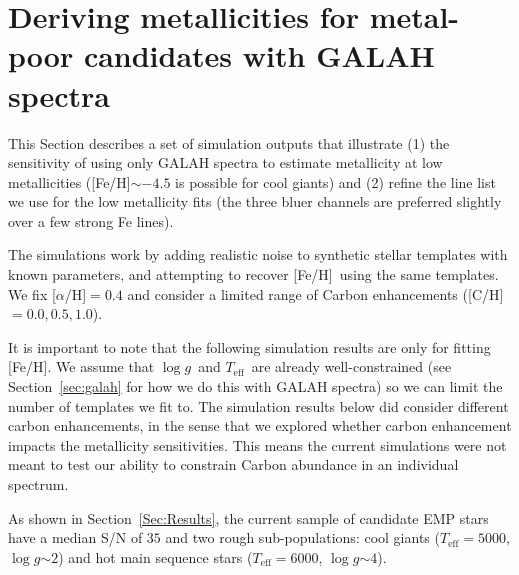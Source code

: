 \documentclass[]{aastex631}
\newcommand{\emps}{EMP stars\xspace}
\newcommand{\logg}{\ensuremath{\log g}\xspace}
\newcommand{\teff}{\ensuremath{T_{\mathrm{eff}}}\xspace}
\newcommand{\feh}{[Fe/H]\xspace}
\begin{document}




\appendix
\section{Deriving metallicities for metal-poor candidates with GALAH spectra}\label{deriving lines}

This Section describes a set of simulation outputs that illustrate (1) the sensitivity of using only GALAH spectra to estimate metallicity at low metallicities (\feh $\sim-4.5$ is possible for cool giants) and (2) refine the line list we use for the low metallicity fits (the three bluer channels are preferred slightly over a few strong Fe lines).

The simulations work by adding realistic noise to synthetic stellar templates with known parameters, and attempting to recover \feh \ using the same templates.  We fix [$\alpha$/H]$=0.4$ and consider a limited range of Carbon enhancements ([C/H]$=0.0, 0.5, 1.0$). 

It is important to note that the following simulation results are only for fitting \feh. We assume that \logg \ and \teff \ are already well-constrained (see Section~\ref{sec:galah} for how we do this with GALAH spectra) so we can limit the number of templates we fit to. The simulation results below did consider different carbon enhancements, in the sense that we explored whether carbon enhancement impacts the metallicity sensitivities. This means the current simulations were not meant to test our ability to constrain Carbon abundance in an individual spectrum.

As shown in Section~\ref{Sec:Results}, the current sample of candidate \emps have a median S/N of $35$ and two rough sub-populations: cool giants (\teff $=5000$, \logg $\sim 2$) and hot main sequence stars (\teff $=6000$, \logg $ \sim 4$).
\end{document}
